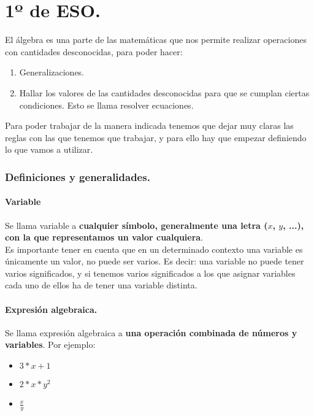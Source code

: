 \documentclass[a4paper,11pt,answers]{exam}
\begin{document}
\part{1º de ESO.}
  El álgebra es una parte de las matemáticas que nos permite realizar operaciones con cantidades desconocidas, para poder hacer:
  \begin{enumerate}
  \item Generalizaciones.
  \item Hallar los valores de las cantidades desconocidas para que se cumplan ciertas condiciones. Esto se llama resolver ecuaciones.
  \end{enumerate}
  Para poder trabajar de la manera indicada tenemos que dejar muy claras las reglas con las que tenemos que trabajar, y para ello hay que empezar definiendo lo que vamos a utilizar.

  \section{Definiciones y generalidades.}
  \subsection{Variable}
  Se llama variable a \textbf{cualquier símbolo, generalmente una letra ($x$, $y$, ...), con la que representamos un valor cualquiera}.\\

  Es importante tener en cuenta que en un determinado contexto una variable es únicamente un valor, no puede ser varios. Es decir: una variable no puede tener varios significados, y si tenemos varios significados a los que asignar variables cada uno de ellos ha de tener una variable distinta.
  \subsection{Expresión algebraica.}
  Se llama expresión algebraica a \textbf{una operación combinada de números y variables}. Por ejemplo:
  \begin{itemize}
  \item $3*x + 1$
  \item $2*x*y^2$
  \item $\frac{x}{y}$
  \end{itemize}
\end{document}
